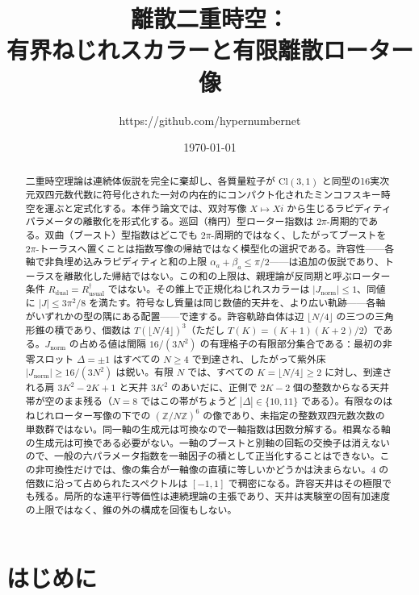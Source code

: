 \documentclass[a4paper]{article}
\title{離散二重時空：\\
有界ねじれスカラーと有限離散ローター像}
\author{https://github.com/hypernumbernet}
\date{\today}
\theoremstyle{definition}
\newcommand{\Jnorm}{J_{\mathrm{norm}}}
\begin{document}
\maketitle

\begin{abstract}
二重時空理論は連続体仮説を完全に棄却し、各質量粒子が $\mathrm{Cl}(3,1)$ と同型の16実次元双四元数代数に符号化された一対の内在的にコンパクト化されたミンコフスキー時空を運ぶと定式化する。本伴う論文では、双対写像 $X \mapsto Xi$ から生じるラピディティパラメータの離散化を形式化する。巡回（楕円）型ローター指数は $2\pi$-周期的である。双曲（ブースト）型指数はどこでも $2\pi$-周期的ではなく、したがってブーストを $2\pi$-トーラスへ置くことは指数写像の帰結ではなく模型化の選択である。許容性——各軸で非負埋め込みラピディティと和の上限 $\alpha_a+\beta_a\leq\pi/2$——は追加の仮説であり、トーラスを離散化した帰結ではない。この和の上限は、親理論が反同期と呼ぶローター条件 $R_{\mathrm{dual}}=R_{\mathrm{usual}}^\dagger$ ではない。その錐上で正規化ねじれスカラーは $|\Jnorm|\leq 1$、同値に $|J|\leq 3\pi^2/8$ を満たす。符号なし質量は同じ数値的天井を、より広い軌跡——各軸がいずれかの型の隅にある配置——で達する。許容軌跡自体は辺 $\lfloor N/4\rfloor$ の三つの三角形錐の積であり、個数は $T(\lfloor N/4\rfloor)^3$（ただし $T(K)=(K+1)(K+2)/2$）である。$\Jnorm$ の占める値は間隔 $16/(3N^2)$ の有理格子の有限部分集合である：最初の非零スロット $\Delta=\pm 1$ はすべての $N\geq 4$ で到達され、したがって紫外床 $|\Jnorm|\geq 16/(3N^2)$ は鋭い。有限 $N$ では、すべての $K=\lfloor N/4\rfloor\geq 2$ に対し、到達される肩 $3K^2-2K+1$ と天井 $3K^2$ のあいだに、正側で $2K-2$ 個の整数からなる天井帯が空のまま残る（$N=8$ ではこの帯がちょうど $|\Delta|\in\{10,11\}$ である）。有限なのはねじれローター写像の下での $(\mathbb{Z}/N\mathbb{Z})^6$ の像であり、未指定の整数双四元数次数の単数群ではない。同一軸の生成元は可換なので一軸指数は因数分解する。相異なる軸の生成元は可換である必要がない。一軸のブーストと別軸の回転の交換子は消えないので、一般の六パラメータ指数を一軸因子の積として正当化することはできない。この非可換性だけでは、像の集合が一軸像の直積に等しいかどうかは決まらない。$4$ の倍数に沿って占められたスペクトルは $[-1,1]$ で稠密になる。許容天井はその極限でも残る。局所的な遠平行等価性は連続理論の主張であり、天井は実験室の固有加速度の上限ではなく、錐の外の構成を回復もしない。
\end{abstract}

\section{はじめに}
\label{sec:intro}
\end{document}
